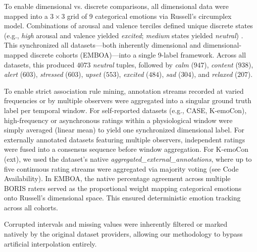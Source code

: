 \documentclass{isd}
\begin{document}
{To enable dimensional vs. discrete comparisons, all dimensional data were mapped into a $3 \times 3$ grid of 9 categorical emotions via Russell's circumplex model. Combinations of arousal and valence terciles defined unique discrete states (e.g., \textit{high} arousal and valence yielded \textit{excited}; \textit{medium} states yielded \textit{neutral}) \cite{russell1980circumplex}. This synchronized all datasets---both inherently dimensional and dimensional-mapped discrete cohorts (EMBOA)---into a single 9-label framework. Across all datasets, this produced $4073$ \textit{neutral} tuples, followed by \textit{calm} ($947$), \textit{content} ($938$), \textit{alert} ($603$), \textit{stressed} ($603$), \textit{upset} ($553$), \textit{excited} ($484$), \textit{sad} ($304$), and \textit{relaxed} ($207$).

To enable strict association rule mining, annotation streams recorded at varied frequencies or by multiple observers were aggregated into a singular ground truth label per temporal window. For self-reported datasets (e.g., CASE, K-emoCon), high-frequency or asynchronous ratings within a physiological window were simply averaged (linear mean) to yield one synchronized dimensional label. For externally annotated datasets featuring multiple observers, independent ratings were fused into a consensus sequence before window aggregation. For K-emoCon (ext), we used the dataset's native \textit{aggregated\_external\_annotations}, where up to five continuous rating streams were aggregated via majority voting (see Code Availability). In EMBOA, the native percentage agreement across multiple BORIS raters served as the proportional weight mapping categorical emotions onto Russell’s dimensional space. This ensured deterministic emotion tracking across all cohorts.

Corrupted intervals and missing values were inherently filtered or marked natively by the original dataset providers, allowing our methodology to bypass artificial interpolation entirely.


}
\end{document}
